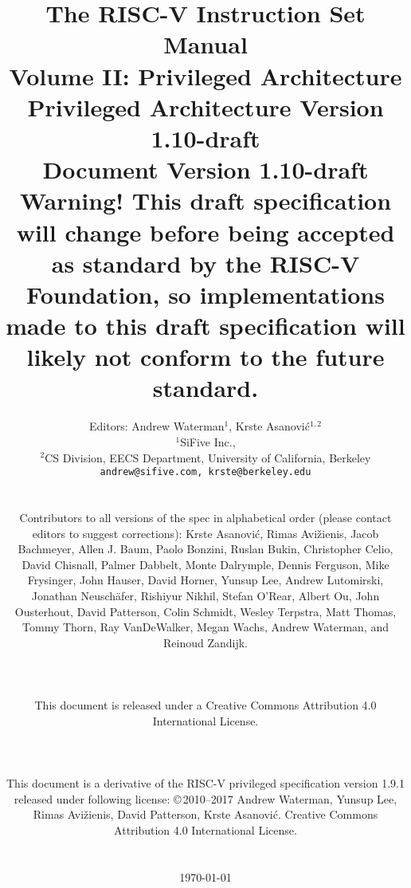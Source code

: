 \documentclass[twoside,11pt]{book}
\newcommand{\privrev}{1.10-draft}
\begin{document}
\title{{\vspace{-0.7in}\Large {\bf The RISC-V Instruction Set Manual}} \\
  \large {\bf Volume II: Privileged Architecture} \\
  Privileged Architecture Version \privrev \\
  Document Version \privrev \\
    {\bf Warning! This draft specification
    will change before being accepted as standard by the RISC-V Foundation, so
    implementations made to this draft specification will likely not conform
    to the future standard.}
  \vspace{-0.1in}}

\author{Editors: Andrew Waterman$^{1}$, Krste Asanovi\'{c}$^{1,2}$ \\
  $^{1}$SiFive Inc., \\
  $^{2}$CS Division, EECS Department, University of California, Berkeley \\
  {\tt andrew@sifive.com, krste@berkeley.edu} \\
  \\
  \parbox{\textwidth}{ Contributors to all versions of the spec in
    alphabetical order (please contact editors to suggest
    corrections): Krste Asanovi\'{c}, Rimas Avi\v{z}ienis, Jacob
    Bachmeyer, Allen J. Baum, Paolo Bonzini, Ruslan Bukin, Christopher
    Celio, David Chisnall, Palmer Dabbelt, Monte Dalrymple, Dennis
    Ferguson, Mike Frysinger, John Hauser, David Horner, Yunsup Lee,
    Andrew Lutomirski, Jonathan Neusch{\"a}fer, Rishiyur Nikhil,
    Stefan O'Rear, Albert Ou, John Ousterhout, David Patterson, Colin
    Schmidt, Wesley Terpstra, Matt Thomas, Tommy Thorn, Ray
    VanDeWalker, Megan Wachs, Andrew Waterman, and Reinoud Zandijk.}
  \\ \\
  \parbox{\textwidth}{
  This document is released under a Creative Commons Attribution 4.0
  International License.
  }
  \\
  \\
  \parbox{\textwidth}{
    This document is a derivative of the RISC-V
    privileged specification version 1.9.1 released under following license:
    \copyright \,2010--2017 Andrew Waterman, Yunsup Lee, Rimas
    Avi\v{z}ienis, David Patterson, Krste Asanovi\'{c}. 
    Creative Commons Attribution 4.0 International License.
  }
  \\
  \\
  \today
}

\date{} 
\maketitle
\end{document}

